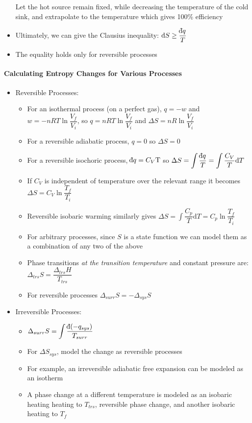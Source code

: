 \documentclass[12pt, openany, letterpaper]{memoir}
\begin{document}
\begin{itemize}
	      Let the hot source remain fixed, while decreasing the temperature of the cold sink, and extrapolate to the temperature which gives 100\% efficiency
	\item Ultimately, we can give the Clausius inequality: $\mathrm{d}S\geq\dfrac{\dbar q}{T}$
	\item The equality holds only for reversible processes
\end{itemize}
\paragraph{Calculating Entropy Changes for Various Processes}
\begin{itemize}
	\item Reversible Processes:
	      \begin{itemize}
		      \item For an isothermal process (on a perfect gas), $q = - w$ and $w = -nRT\ln\dfrac{V_f}{V_i}$, so $q = nRT\ln\dfrac{V_f}{V_i}$ and $\Delta S = nR\ln\dfrac{V_f}{V_i}$
		      \item For a reversible adiabatic process, $q=0$ so $\Delta S =0$
		      \item For a reversible isochoric process, $\dbar q=C_V\mathrm{T}$ so $\Delta S = \displaystyle\int\dfrac{\dbar q}{T} = \int\dfrac{C_V}{T}\mathrm{d}T$
		      \item If $C_V$ is independent of temperature over the relevant range it becomes $\Delta S = C_V\ln\dfrac{T_f}{T_i}$
		      \item Reversible isobaric warming similarly gives $\Delta S = \int\dfrac{C_p}{T}\mathrm{d}T = C_p\ln\dfrac{T_f}{T_i}$
		      \item For arbitrary processes, since $S$ is a state function we can model them as a combination of any two of the above
		      \item Phase transitions \emph{at the transition temperature} and constant pressure are: $\Delta_{trs}S=\dfrac{\Delta_{trs}H}{T_{trs}}$
		      \item For reversible processes $\Delta_{surr}S = -\Delta_{sys}S$
	      \end{itemize}
	\item Irreversible Processes:
	      \begin{itemize}
		      \item $\Delta_{surr}S = \displaystyle\int\dfrac{\dbar (-q_{sys})}{T_{surr}}$
		      \item For $\Delta S_{sys}$, model the change as reversible processes
		      \item For example, an irreversible adiabatic free expansion can be modeled as an isotherm
		      \item A phase change at a different temperature is modeled as an isobaric heating heating to $T_{trs}$, reversible phase change, and another isobaric heating to $T_f$
	      \end{itemize}
\end{itemize}
\end{document}
